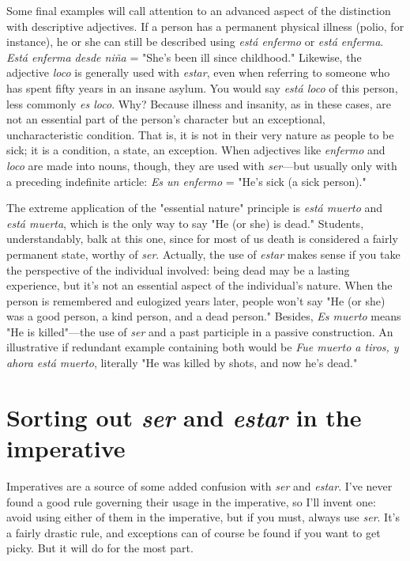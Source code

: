 \documentclass[14pt,a4paper,oneside]{memoir}
\begin{document}
Some final examples will call attention to an advanced aspect
of the distinction with descriptive adjectives. If a person has a permanent physical illness (polio, for instance), he or she can still be described using \emph{está enfermo} or \emph{está enferma}. \emph{Está enferma desde niña} =
"She's been ill since childhood." Likewise, the adjective \emph{loco} is generally used with \emph{estar}, even when referring to someone who has spent
fifty years in an insane asylum. You would say \emph{está loco} of this person,
less commonly \emph{es loco}. Why? Because illness and insanity, as in these
cases, are not an essential part of the person's character but an exceptional, uncharacteristic condition. That is, it is not in their very nature
as people to be sick; it is a condition, a state, an exception. When adjectives like \emph{enfermo} and \emph{loco} are made into nouns, though, they are
used with \emph{ser}---but usually only with a preceding indefinite article: \emph{Es
	un enfermo} = "He's sick (a sick person)."

The extreme application of the "essential nature" principle is
\emph{está muerto} and \emph{está muerta}, which is the only way to say "He (or
she) is dead." Students, understandably, balk at this one, since for most
of us death is considered a fairly permanent state, worthy of \emph{ser}. Actually, the use of \emph{estar} makes sense if you take the perspective of the
individual involved: being dead may be a lasting experience, but it's
not an essential aspect of the individual's nature. When the person is
remembered and eulogized years later, people won't say "He (or she)
was a good person, a kind person, and a dead person." Besides, \emph{Es
	muerto} means "He is killed"---the use of \emph{ser} and a past participle in a
passive construction. An illustrative if redundant example containing
both would be \emph{Fue muerto a tiros, y ahora está muerto}, literally "He
was killed by shots, and now he's dead."

\section{Sorting out \emph{ser} and \emph{estar} in the imperative}

Imperatives are a source of some added confusion with \emph{ser} and
\emph{estar}. I've never found a good rule governing their usage in the imperative, so I'll invent one: avoid using either of them in the imperative,
but if you must, always use \emph{ser}. It's a fairly drastic rule, and exceptions
can of course be found if you want to get picky. But it will do for the
most part.
\end{document}

